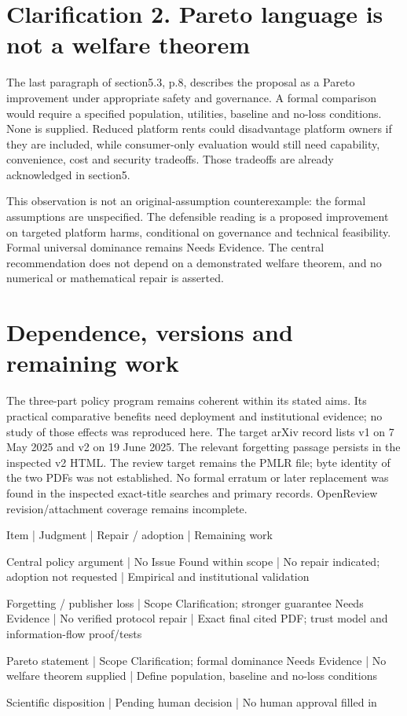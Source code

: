 \documentclass[10pt]{article}
\begin{document}
\section*{Clarification 2. Pareto language is not a welfare theorem}
The last paragraph of section5.3, p.8, describes the proposal as a Pareto improvement under appropriate safety and governance. A formal comparison would require a specified population, utilities, baseline and no-loss conditions. None is supplied. Reduced platform rents could disadvantage platform owners if they are included, while consumer-only evaluation would still need capability, convenience, cost and security tradeoffs. Those tradeoffs are already acknowledged in section5.\par
This observation is not an original-assumption counterexample: the formal assumptions are unspecified. The defensible reading is a proposed improvement on targeted platform harms, conditional on governance and technical feasibility. Formal universal dominance remains Needs Evidence. The central recommendation does not depend on a demonstrated welfare theorem, and no numerical or mathematical repair is asserted.\par
\section*{Dependence, versions and remaining work}
The three-part policy program remains coherent within its stated aims. Its practical comparative benefits need deployment and institutional evidence; no study of those effects was reproduced here. The target arXiv record lists v1 on 7 May 2025 and v2 on 19 June 2025. The relevant forgetting passage persists in the inspected v2 HTML. The review target remains the PMLR file; byte identity of the two PDFs was not established. No formal erratum or later replacement was found in the inspected exact-title searches and primary records. OpenReview revision/attachment coverage remains incomplete.\par
Item | Judgment | Repair / adoption | Remaining work\par
Central policy argument | No Issue Found within scope | No repair indicated; adoption not requested | Empirical and institutional validation\par
Forgetting / publisher loss | Scope Clarification; stronger guarantee Needs Evidence | No verified protocol repair | Exact final cited PDF; trust model and information-flow proof/tests\par
Pareto statement | Scope Clarification; formal dominance Needs Evidence | No welfare theorem supplied | Define population, baseline and no-loss conditions\par
Scientific disposition | Pending human decision | No human approval filled in\par
\end{document}
